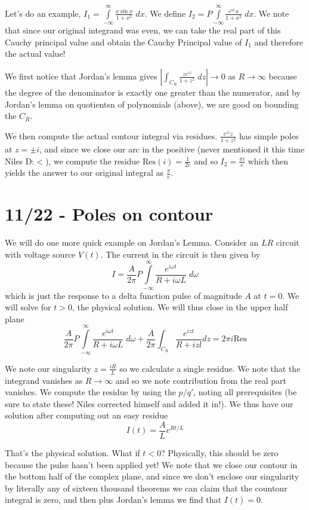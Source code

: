 \documentclass[10pt]{report}
\newcommand{\abs}[1]{\left|#1\right|}
\newcommand{\Res}[0]{\mathrm{Res} }
\begin{document}
Let's do an example, $I_1 = \displaystyle\int\limits_{-\infty}^{\infty}\frac{x\sin x}{1+x^2}\;dx$. We define $I_2 = P\displaystyle\int\limits_{-\infty}^{\infty}\frac{e^{ix}x}{1+x^2}\;dx$. We note that since our original integrand was even, we can take the real part of this Cauchy principal value and obtain the Cauchy Principal value of $I_1$ and therefore the actual value!

We first notice that Jordan's lemma gives $\abs{\int_{C_R}\frac{ze^{iz}}{1+z^2}\; dz} \to 0$ as $R \to \infty$ because the degree of the denominator is exactly one greater than the numerator, and by Jordan's lemma on quotientsn of polynomials (above), we are good on bounding the $C_R$.

We then compute the actual contour integral via residues. $\frac{e^{iz}z}{1+z^2}$ has simple poles at $z = \pm i$, and since we close our arc in the positive (never mentioned it this time Niles D:$<$), we compute the residue $\Res(i) = \frac{1}{2e}$ and so $I_2 = \frac{\pi i}{e}$ which then yields the answer to our original integral as $\frac{\pi}{e}$. 

\chapter{11/22 - Poles on contour}

We will do one more quick example on Jordan's Lemma. Consider an $LR$ circuit with voltage source $V(t)$. The current in the circuit is then given by 
$$I = \frac{A}{2\pi}P\displaystyle\int\limits_{-\infty}^{\infty}\frac{e^{i\omega t}}{R+ i\omega L}\;d\omega$$
which is just the response to a delta function pulse of magnitude $A$ at $t=0$. We will solve for $t > 0$, the physical solution. We will thus close in the upper half plane
$$\frac{A}{2\pi}P\displaystyle\int\limits_{-\infty}^{\infty}\frac{e^{i\omega t}}{R+ i\omega L}\;d\omega + \frac{A}{2\pi}\int_{C_R} \frac{e^{izt}}{R + izl}dz = 2\pi i \Res$$

We note our singularity $z =  \frac{iR}{L}$ so we calculate a single residue. We note that the integrand vanishes as $R \to \infty$ and so we note contribution from the real part vanishes. We compute the residue by using the $p/q'$, noting all prerequisites (be sure to state these! Niles corrected himself and added it in!). We thus have our solution after computing out an easy residue
$$I(t) = \frac{A}{L}e^{Rt/L}$$

That's the physical solution. What if $t < 0$? Physically, this should be zero because the pulse hasn't been applied yet! We note that we close our contour in the bottom half of the complex plane, and since we don't enclose our singularity by literally any of sixteen thousand theorems we can claim that the countour integral is zero, and then plus Jordan's lemma we find that $I(t) = 0$. 
\end{document}
